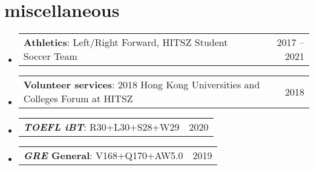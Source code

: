 \documentclass[a4paper,12pt]{article}
\makeatletter
\newcommand{\resumeProjectHeading}[2]{
    \item
    \begin{tabular*}{0.97\textwidth}{l@{\extracolsep{\fill}}r}
      \small#1 & #2 \\
    \end{tabular*}\vspace{-7pt}
}
\newcommand{\resumeSubHeadingListStart}{\begin{itemize}[leftmargin=0.15in, label={}]}
\newcommand{\resumeSubHeadingListEnd}{\end{itemize}}
\makeatother
\begin{document}
\section{miscellaneous}
    \resumeSubHeadingListStart
      \resumeProjectHeading
        {\textbf{Athletics}: Left/Right Forward, HITSZ Student Soccer Team}{2017 – 2021}
      \resumeProjectHeading
        {\textbf{Volunteer services}: 2018 Hong Kong Universities and Colleges Forum at HITSZ}{2018}
      \resumeProjectHeading
        {\textbf{\textsl{\small TOEFL iBT}\textsuperscript{\textregistered}}: 
                R30+L30+S28+W29 
         }{2020}
      \resumeProjectHeading
         {\textbf{\textsl{\small GRE}\textsuperscript{\textregistered} General}: 
                V168+Q170+AW5.0
         }{2019}
    \resumeSubHeadingListEnd
\end{document}

